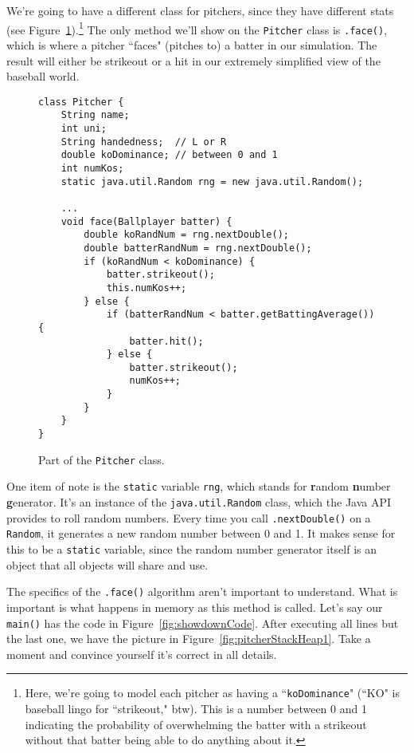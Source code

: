 We're going to have a different class for pitchers, since they have different
stats (see Figure~\ref{fig:PitcherCode}).\footnote{Here, we're going to model
each pitcher as having a ``\texttt{koDominance}" (``KO" is baseball lingo for
``strikeout," btw). This is a number between 0 and 1 indicating the
probability of overwhelming the batter with a strikeout without that batter
being able to do anything about it.} The only method we'll show on the
\texttt{Pitcher} class is \texttt{.face()}, which is where a pitcher ``faces"
(pitches to) a batter in our simulation. The result will either be strikeout
or a hit in our extremely simplified view of the baseball world.

\begin{figure}[ht]
\begin{Verbatim}[fontsize=\footnotesize,samepage=true,frame=single]
class Pitcher {
    String name;
    int uni;
    String handedness;  // L or R
    double koDominance; // between 0 and 1
    int numKos;
    static java.util.Random rng = new java.util.Random();

    ...
    void face(Ballplayer batter) {
        double koRandNum = rng.nextDouble();
        double batterRandNum = rng.nextDouble();
        if (koRandNum < koDominance) {
            batter.strikeout();
            this.numKos++;
        } else {
            if (batterRandNum < batter.getBattingAverage()) {
                batter.hit();
            } else {
                batter.strikeout();
                numKos++;
            }
        }
    }
}
\end{Verbatim}
\caption{Part of the \texttt{Pitcher} class.}
\label{fig:PitcherCode}
\end{figure}

One item of note is the \texttt{static} variable \texttt{rng}, which stands
for \textbf{r}andom \textbf{n}umber \textbf{g}enerator. It's an instance of
the \texttt{java.util.Random} class, which the Java API provides to roll
random numbers. Every time you call \texttt{.nextDouble()} on a
\texttt{Random}, it generates a new random number between 0 and 1. It makes
sense for this to be a \texttt{static} variable, since the random number
generator itself is an object that all objects will share and use.

The specifics of the \texttt{.face()} algorithm aren't important to
understand. What is important is what happens in memory as this method is
called. Let's say our \texttt{main()} has the code in
Figure~\ref{fig:showdownCode}. After executing all lines but the last one, we
have the picture in Figure~\ref{fig:pitcherStackHeap1}. Take a moment and
convince yourself it's correct in all details.

